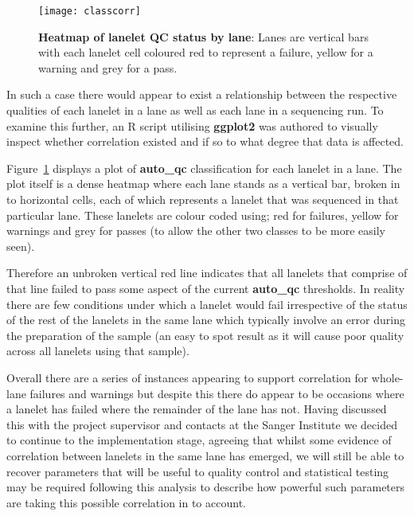 \begin{figure}[htbp!]
    \centering
    \texttt{[image: classcorr]}
    \caption[ClassCorr]{\textbf{Heatmap of lanelet QC status by lane}: Lanes are
    vertical bars with each lanelet cell coloured red to represent a failure,
yellow for a warning and grey for a pass.}
    \label{fig:classcorr}
\end{figure}

In such a case there would appear to exist a relationship between the respective
qualities of each lanelet in a lane as well as each lane in a sequencing run. To
examine this further, an R script utilising \textbf{ggplot2} was authored to
visually inspect whether correlation existed and if so to what degree that data
is affected.

Figure~\ref{fig:classcorr} displays a plot of \textbf{auto\_qc} classification
for each lanelet in a lane. The plot itself is a dense heatmap
where each lane stands as a vertical bar, broken in to horizontal cells, each
of which represents a lanelet that was sequenced in that particular lane. These
lanelets are colour coded using; red for failures, yellow for warnings and grey
for passes (to allow the other two classes to be more easily seen).

Therefore an unbroken vertical red line indicates that all lanelets that
comprise of that line failed to pass some aspect of the current
\textbf{auto\_qc} thresholds. In reality there are few conditions under which
a lanelet would fail irrespective of the status of the rest of the lanelets in
the same lane which typically involve an error during the preparation of the
sample (an easy to spot result as it will cause poor quality across all lanelets
using that sample).

Overall there are a series of instances appearing to support correlation for
whole-lane failures and warnings but despite this there do appear to be occasions
where a lanelet has failed where the remainder of the lane has not.
Having discussed this with the project supervisor and contacts at the Sanger Institute we decided to continue to
the implementation stage, agreeing that whilst some evidence of correlation
between lanelets in the same lane has emerged, we will still be able to recover
parameters that will be useful to quality control and statistical testing may be
required following this analysis to describe how powerful such parameters are
taking this possible correlation in to account.

